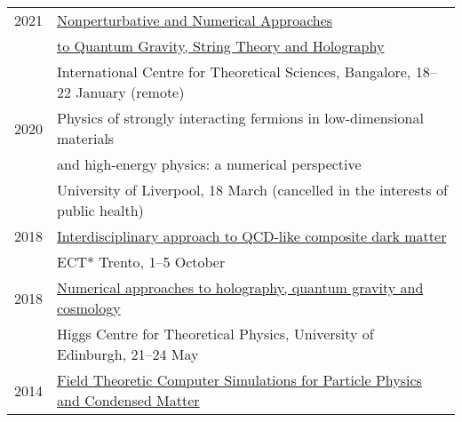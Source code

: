 \documentclass[10 pt]{article}
\begin{document}
\vspace{-12 pt} %
\begin{tabular}[t]{cl}
  2021 & \href{https://www.icts.res.in/program/numstrings2021}{Nonperturbative and Numerical Approaches}                                                                             \\
       & \hfill \href{https://www.icts.res.in/program/numstrings2021}{to Quantum Gravity, String Theory and Holography}                                                              \\
       & International Centre for Theoretical Sciences, Bangalore, 18--22 January (remote)                                                                                           \\[6 pt]
  2020 & Physics of strongly interacting fermions in low-dimensional materials                                                                                                       \\
       & \hfill and high-energy physics: a numerical perspective                                                                                                                     \\
       & University of Liverpool, 18 March (cancelled in the interests of public health)                                                                                             \\[6 pt]
  2018 & \href{https://www.ectstar.eu/workshops/interdisciplinary-approach-to-qcd-like-composite-dark-matter/}{Interdisciplinary approach to QCD-like composite dark matter}         \\
       & ECT* Trento, 1--5 October                                                                                                                                                   \\[6 pt]
  2018 & \href{https://higgs.ph.ed.ac.uk/workshops/numerical-approaches-holography-quantum-gravity-and-cosmology}{Numerical approaches to holography, quantum gravity and cosmology} \\
       & Higgs Centre for Theoretical Physics, University of Edinburgh, 21--24 May                                                                                                   \\[6 pt]
  2014 & \href{http://blogs.bu.edu/ppcm/}{Field Theoretic Computer Simulations for Particle Physics and Condensed Matter}                                                            \\

\end{tabular}
\end{document}
